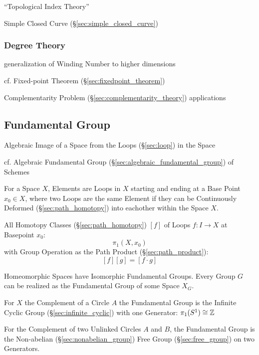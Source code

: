 ``Topological Index Theory''

Simple Closed Curve (\S\ref{sec:simple_closed_curve})



\subsubsection{Degree Theory}\label{sec:degree_theory}

generalization of Winding Number to higher dimensions

cf. Fixed-point Theorem (\S\ref{sec:fixedpoint_theorem})

Complementarity Problem (\S\ref{sec:complementarity_theory}) applications



\subsection{Fundamental Group}\label{sec:fundamental_group}

Algebraic Image of a Space from the Loops (\S\ref{sec:loop}) in the
Space

cf. Algebraic Fundamental Group (\S\ref{sec:algebraic_fundamental_group}) of
Schemes

For a Space $X$, Elements are Loops in $X$ starting and ending at a
Base Point $x_0 \in X$, where two Loops are the same Element if they
can be Continuously Deformed (\S\ref{sec:path_homotopy}) into
eachother within the Space $X$.

All Homotopy Classes (\S\ref{sec:path_homotopy}) $[f]$ of Loops $f : I
\rightarrow X$ at Basepoint $x_0$:
\[
  \pi_1(X,x_0)
\]
with Group Operation as the Path Product (\S\ref{sec:path_product}):
\[
  [f][g] = [f \cdot g]
\]

Homeomorphic Spaces have Isomorphic Fundamental Groups. Every Group
$G$ can be realized as the Fundamental Group of some Space $X_G$.
\cite{hatcher02}

For $X$ the Complement of a Circle $A$ the Fundamental Group is the
Infinite Cyclic Group (\S\ref{sec:infinite_cyclic}) with one
Generator: $\pi_1(S^1) \cong \mathbb{Z}$

For the Complement of two Unlinked Circles $A$ and $B$, the
Fundamental Group is the Non-abelian (\S\ref{sec:nonabelian_group})
Free Group (\S\ref{sec:free_group}) on two Generators.


